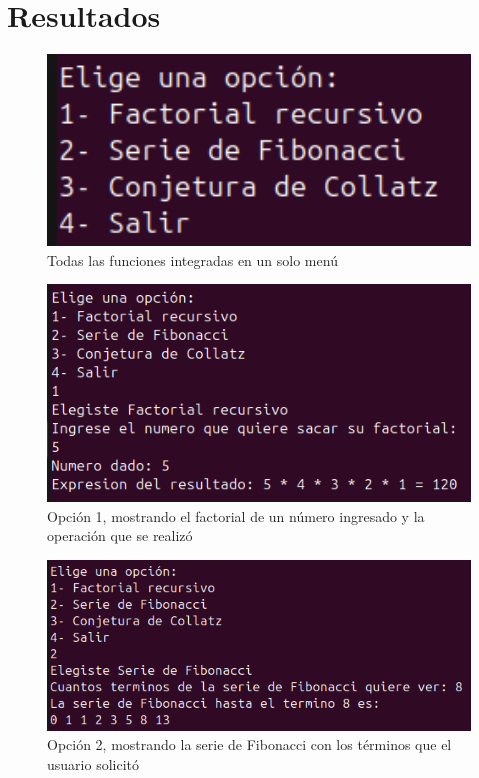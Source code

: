 \documentclass[letterpaper,12pt]{article}
\begin{document}
\section{Resultados}

\begin{figure}[H]
    \centering
    \includegraphics[width=12cm]{Imagenes/Menu.png}
    \caption*{Todas las funciones integradas en un solo menú}
\end{figure}

\begin{figure}[H]
    \centering
    \includegraphics[width=15cm]{Imagenes/Factorial.png}
    \caption*{\centering Opción 1, mostrando el factorial de un número ingresado y la operación que se realizó}
\end{figure}

\begin{figure}[H]
    \centering
    \includegraphics[width=15cm]{Imagenes/Fibonacci.png}
    \caption*{\centering Opción 2, mostrando la serie de Fibonacci con los términos que el usuario solicitó}
\end{figure}
\end{document}
